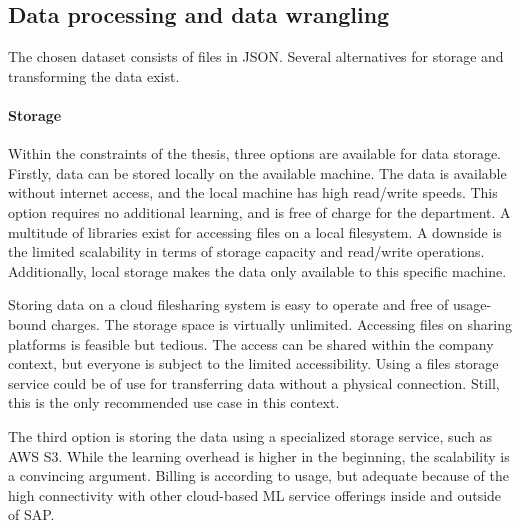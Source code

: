 	\subsection{Data processing and data wrangling}
	The chosen dataset consists of files in \ac{JSON}. Several alternatives for storage and transforming the data exist. 
	
	\paragraph{Storage}
	Within the constraints of the thesis, three options are available for data storage. Firstly, data can be stored locally on the available machine. The data is available without internet access, and the local machine has high read/write speeds. This option requires no additional learning, and is free of charge for the department. A multitude of libraries exist for accessing files on a local filesystem. A downside is the limited scalability in terms of storage capacity and read/write operations. Additionally, local storage makes the data only available to this specific machine.
	
	Storing data on a cloud filesharing system is easy to operate and free of usage-bound charges. The storage space is virtually unlimited. Accessing files on sharing platforms is feasible but tedious. The access can be shared within the company context, but everyone is subject to the limited accessibility. Using a files storage service could be of use for transferring data without a physical connection. Still, this is the only recommended use case in this context.
	
	The third option is storing the data using a specialized storage service, such as AWS S3. While the learning overhead is higher in the beginning, the scalability is a convincing argument. Billing is according to usage, but adequate because of the high connectivity with other cloud-based ML service offerings inside and outside of SAP.
	

